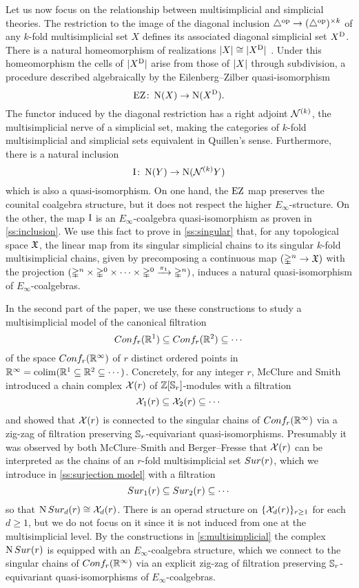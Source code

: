 Let us now focus on the relationship between multisimplicial and simplicial theories.
The restriction to the image of the diagonal inclusion $\triangle^{\mathrm{op}} \to (\triangle^{\mathrm{op}})^{\times k}$ of any $k$-fold multisimplicial set $X$ defines its associated diagonal simplicial set $X^{\mathrm{D}}$.
There is a natural homeomorphism of realizations $\lvert X\rvert \cong \lvert X^{\mathrm{D}}\rvert$
\cite{quillen2010higheralgktheory}.
Under this homeomorphism the cells of $\lvert X^{\mathrm{D}}\rvert$ arise from those of $\lvert X\rvert$ through subdivision, a procedure described algebraically by the Eilenberg--Zilber quasi-isomorphism
\[
\operatorname{EZ} \colon \operatorname{N}(X) \to \operatorname{N}(X^{\mathrm{D}}).
\]
The functor induced by the diagonal restriction has a right adjoint $\mathcal{N}^{(k)}$, the multisimplicial nerve of a simplicial set, making the categories of $k$-fold multisimplicial and simplicial sets equivalent in Quillen's sense.
Furthermore, there is a natural inclusion
\[
\operatorname{I} \colon \operatorname{N}(Y) \to \operatorname{N}(\mathcal{N}^{(k)} Y)
\]
which is also a quasi-isomorphism.
On one hand, the $\operatorname{EZ}$ map preserves the counital coalgebra structure, but it does not respect the higher $E_\infty$-structure.
On the other, the map $\operatorname{I}$ is an $E_\infty$-coalgebra quasi-isomorphism as proven in \cref{ss:inclusion}.
We use this fact to prove in \cref{ss:singular} that, for any topological space $\mathfrak{X}$, the linear map from its singular simplicial chains to its singular $k$-fold multisimplicial chains, given by precomposing a continuous map $(\mathbb{\Delta}^n \to \mathfrak{X})$ with the projection $(\mathbb{\Delta}^n \times \mathbb{\Delta}^{0}\times\dots\times\mathbb{\Delta}^{0} \xrightarrow{\pi_1} \mathbb{\Delta}^n)$, induces a natural quasi-isomorphism of $E_\infty$-coalgebras.

In the second part of the paper, we use these constructions to study a multisimplicial model of the canonical filtration
\[
Conf_{r}(\mathbb{R}^{1}) \subseteq Conf_{r}(\mathbb{R}^{2}) \subseteq \dotsb
\]
of the space $Conf_{r}(\mathbb{R}^{\infty})$ of $r$ distinct ordered points in $\mathbb{R}^\infty = \operatorname*{colim} (\mathbb{R}^1 \subseteq \mathbb{R}^2 \subseteq \dotsb)$.
Concretely, for any integer $r$, McClure and Smith \cite{mcclure2003multivariable} introduced a chain complex $\mathcal{X}(r)$ of $\mathbb{Z}[\mathbb{S}_r]$-modules with a filtration
\[
\mathcal{X}_{1}(r) \subseteq \mathcal{X}_{2}(r) \subseteq \dotsb
\]
and showed that $\mathcal{X}(r)$ is connected to the singular chains of $Conf_{r}(\mathbb{R}^{\infty})$ via a zig-zag of filtration preserving $\mathbb{S}_r$-equivariant quasi-isomorphisms.
Presumably it was observed by both McClure--Smith and Berger--Fresse that $\mathcal{X}(r)$ can be interpreted as the chains of an $r$-fold multisimplicial set $Sur(r)$, which we introduce in \cref{ss:surjection model} with a filtration
\[
Sur_{1}(r) \subseteq Sur_{2}(r) \subseteq \dotsb
\]
so that $\operatorname{N}Sur_{d}(r) \cong \mathcal{X}_{d}(r)$.
There is an operad structure on $\{\mathcal{X}_{d}(r)\}_{r \geq 1}$ for each $d \geq 1$, but we do not focus on it since it is not induced from one at the multisimplicial level.
By the constructions in \cref{s:multisimplicial} the complex $\operatorname{N}Sur(r)$ is equipped with an $E_\infty$-coalgebra structure, which we connect to the singular chains of $Conf_{r}(\mathbb{R}^{\infty})$ via an explicit zig-zag of filtration preserving $\mathbb{S}_r$-equivariant quasi-isomorphisms of $E_\infty$-coalgebras.

